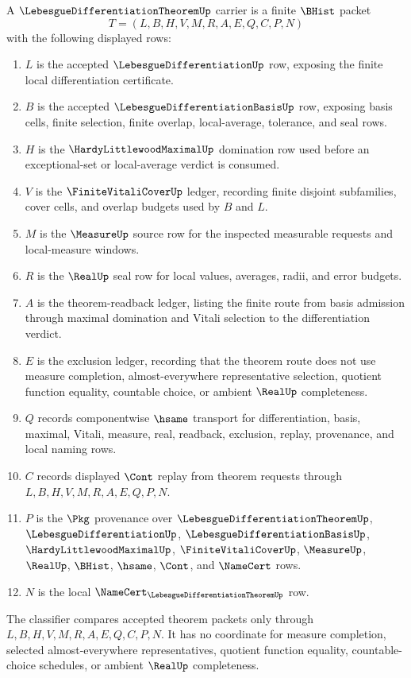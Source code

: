 \begin{definition}\label{def:lebesgue-differentiation-theorem-carrier}
A $\LebesgueDifferentiationTheoremUp$ carrier is a finite $\BHist$ packet
$$
T=(L,B,H,V,M,R,A,E,Q,C,P,N)
$$
with the following displayed rows:
\begin{enumerate}
\item $L$ is the accepted $\LebesgueDifferentiationUp$ row, exposing the finite local differentiation certificate.
\item $B$ is the accepted $\LebesgueDifferentiationBasisUp$ row, exposing basis cells, finite selection, finite overlap, local-average, tolerance, and seal rows.
\item $H$ is the $\HardyLittlewoodMaximalUp$ domination row used before an exceptional-set or local-average verdict is consumed.
\item $V$ is the $\FiniteVitaliCoverUp$ ledger, recording finite disjoint subfamilies, cover cells, and overlap budgets used by $B$ and $L$.
\item $M$ is the $\MeasureUp$ source row for the inspected measurable requests and local-measure windows.
\item $R$ is the $\RealUp$ seal row for local values, averages, radii, and error budgets.
\item $A$ is the theorem-readback ledger, listing the finite route from basis admission through maximal domination and Vitali selection to the differentiation verdict.
\item $E$ is the exclusion ledger, recording that the theorem route does not use measure completion, almost-everywhere representative selection, quotient function equality, countable choice, or ambient $\RealUp$ completeness.
\item $Q$ records componentwise $\hsame$ transport for differentiation, basis, maximal, Vitali, measure, real, readback, exclusion, replay, provenance, and local naming rows.
\item $C$ records displayed $\Cont$ replay from theorem requests through $L,B,H,V,M,R,A,E,Q,P,N$.
\item $P$ is the $\Pkg$ provenance over $\LebesgueDifferentiationTheoremUp$, $\LebesgueDifferentiationUp$, $\LebesgueDifferentiationBasisUp$, $\HardyLittlewoodMaximalUp$, $\FiniteVitaliCoverUp$, $\MeasureUp$, $\RealUp$, $\BHist$, $\hsame$, $\Cont$, and $\NameCert$ rows.
\item $N$ is the local $\NameCert_{\LebesgueDifferentiationTheoremUp}$ row.
\end{enumerate}
The classifier compares accepted theorem packets only through $L,B,H,V,M,R,A,E,Q,C,P,N$. It has no coordinate for measure completion, selected almost-everywhere representatives, quotient function equality, countable-choice schedules, or ambient $\RealUp$ completeness.
\end{definition}

